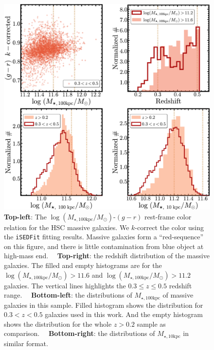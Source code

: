 \documentclass[a4paper,fleqn,usenatbib]{mnras}
\def\minn{{$M_{\star,10\mathrm{kpc}}$}}
\def\mtot{{$M_{\star,100\mathrm{kpc}}$}}
\def\logmtot{{$\log (M_{\star,100\mathrm{kpc}}/M_{\odot})$}}
\begin{document}





\appendix
 
  \begin{figure}
      \centering 
      \includegraphics[width=\columnwidth]{fig/redbcg_sample_stats}
      \caption{
          \textbf{Top-left}: The \logmtot{}-$(g-r)$ rest-frame color relation for the 
          HSC massive galaxies.
          We $k$-correct the color using the \texttt{iSEDFit} fitting results.
          Massive galaxies form a ``red-sequence'' on this figure, and there is 
          little contamination from blue object at high-mass end.~~          
          \textbf{Top-right}: the redshift distribution of the massive galaxies. 
          The filled and empty histograms are for the \logmtot{}$>11.6$ and 
          \logmtot{}$>11.2$ galaxies.
          The vertical lines highlights the $0.3\leq z \leq 0.5$ redshift range.~~
          \textbf{Bottom-left}: the distributions of \mtot{} of massive galaxies in 
          this sample. 
          Filled histogram shows the distribution for $0.3 < z < 0.5$ galaxies 
          used in this work. 
          And the empty histogram shows the distribution for the whole $z>0.2$ sample
          as comparison.~~
          \textbf{Bottom-right}: the distributions of \minn{} in similar format. 
      }
      \label{fig:sample_stats}
  \end{figure}
   
\end{document}

